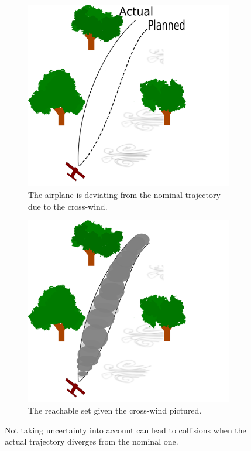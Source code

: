 \begin{figure}
  \begin{subfigure}{0.5\textwidth}
    \includegraphics[width=\textwidth]{figures/experiments/experiment-setup-no-funnel}
    \caption{The airplane is deviating from the nominal trajectory due to the
      cross-wind.}
  \end{subfigure}%
  \;
  \begin{subfigure}{0.5\textwidth}
    \includegraphics[width=\textwidth]{figures/experiments/experiment-setup-funnel}
    \caption{The reachable set given the cross-wind pictured.}
  \end{subfigure}
  \caption{Not taking uncertainty into account can lead to collisions when the
    actual trajectory diverges from the nominal one.}
\end{figure}

